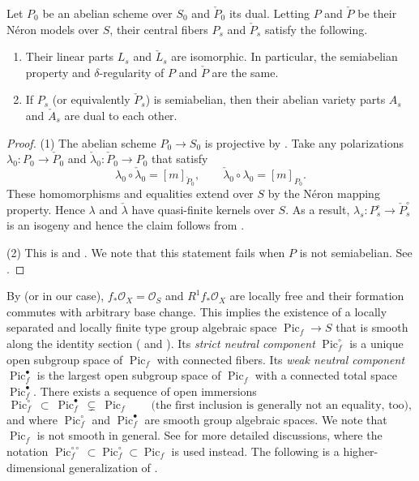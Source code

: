 \documentclass[reqno, letterpaper]{amsart}
\numberwithin{equation}{subsection}
\let\to\longrightarrow
\DeclareMathOperator{\Pic}{Pic}
\begin{document}
		\begin{proposition} \label{prop:dual Neron model}
			Let $P_0$ be an abelian scheme over $S_0$ and $\check P_0$ its dual. Letting $P$ and $\check P$ be their N\'eron models over $S$, their central fibers $P_s$ and $\check P_s$ satisfy the following.
			\begin{enumerate}
				\item Their linear parts $L_s$ and $\check L_s$ are isomorphic. In particular, the semiabelian property and $\delta$-regularity of $P$ and $\check P$ are the same.
				\item If $P_s$ (or equivalently $\check P_s$) is semiabelian, then their abelian variety parts $A_s$ and $\check A_s$ are dual to each other.
			\end{enumerate}
		\end{proposition}
		\begin{proof}
			(1) The abelian scheme $P_0 \to S_0$ is projective by \cite[Theorem~XI.1.4]{ray:group_schemes}. Take any polarizations $\lambda_0 : P_0 \to \check P_0$ and $\check \lambda_0 : \check P_0 \to P_0$ that satisfy
			\[ \lambda_0 \circ \check \lambda_0 = [m]_{\check P_0} ,\qquad \check \lambda_0 \circ \lambda_0 = [m]_{P_0} .\]
			These homomorphisms and equalities extend over $S$ by the N\'eron mapping property. Hence $\lambda$ and $\check \lambda$ have quasi-finite kernels over $S$. As a result, $\lambda_s : P^\circ_s \to \check P^\circ_s$ is an isogeny and hence the claim follows from .
			
			\medskip
			
			(2) This is \cite[IX~Theorem~5.4]{SGA7I} and \cite[\S II.2]{fal-chai:abelian}. We note that this statement fails when $P$ is not semiabelian. See .
		\end{proof}
		
		By \cite[Theorem~1]{kol-kov25} (or  in our case), $f_* \mathcal O_X = \mathcal O_S$ and $R^1f_*\mathcal O_X$ are locally free and their formation commutes with arbitrary base change. This implies the existence of a locally separated and locally finite type group algebraic space $\Pic_f \to S$ that is smooth along the identity section (\cite[Theorem~8.3.1 and 8.4.1]{neron} and \cite[Tag~0D2D]{stacks-project}). Its \emph{strict neutral component} $\Pic^\circ_f$ is a unique open subgroup space of $\Pic_f$ with connected fibers. Its \emph{weak neutral component} $\Pic^\bullet_f$ is the largest open subgroup space of $\Pic_f$ with a connected total space $\Pic^\bullet_f$. There exists a sequence of open immersions
		\[ \Pic^\circ_f \ \subset \ \Pic^\bullet_f \ \subsetneq \ \Pic_f \qquad\mbox{(the first inclusion is generally not an equality, too)} ,\]
		and where $\Pic^\circ_f$ and $\Pic^\bullet_f$ are smooth group algebraic spaces. We note that $\Pic_f$ is not smooth in general. See \cite[\S 2.2]{kim24} for more detailed discussions, where the notation $\Pic^{\circ\circ}_f \subset \Pic^\circ_f\subset \Pic_f$ is used instead. The following is a higher-dimensional generalization of \cite[Theorem~9.5.4]{neron}.
		
\end{document}
